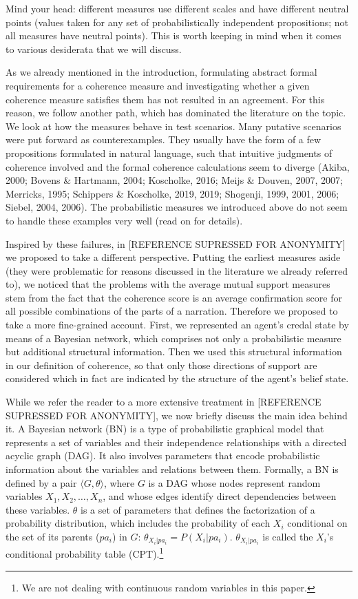 \documentclass[
  10pt,
]{scrartcl}
\begin{document}
Mind your head: different measures use different scales and have different neutral points (values taken for any set of probabilistically independent propositions; not all measures have neutral points). This is worth keeping in mind when it comes to various desiderata that we will discuss.

As we already mentioned in the introduction, formulating abstract formal requirements for a coherence measure and investigating whether a given coherence measure satisfies them has not resulted in an agreement. For this reason, we follow another path, which has dominated the literature on the topic. We look at how the measures behave in test scenarios. Many putative scenarios were put forward as counterexamples. They usually have the form of a few propositions formulated in natural language, such that intuitive judgments of coherence involved and the formal coherence calculations seem to diverge (Akiba, 2000; Bovens \& Hartmann, 2004; Koscholke, 2016; Meijs \& Douven, 2007, 2007; Merricks, 1995; Schippers \& Koscholke, 2019, 2019; Shogenji, 1999, 2001, 2006; Siebel, 2004, 2006). The probabilistic measures we introduced above do not seem to handle these examples very well (read on for details).

Inspired by these failures, in {[}REFERENCE SUPRESSED FOR ANONYMITY{]} we proposed to take a different perspective. Putting the earliest measures aside (they were problematic for reasons discussed in the literature we already referred to), we noticed that the problems with the average mutual support measures stem from the fact that the coherence score is an average confirmation score for all possible combinations of the parts of a narration. Therefore we proposed to take a more fine-grained account. First, we represented an agent's credal state by means of a Bayesian network, which comprises not only a probabilistic measure but additional structural information. Then we used this structural information in our definition of coherence, so that only those directions of support are considered which in fact are indicated by the structure of the agent's belief state.

While we refer the reader to a more extensive treatment in {[}REFERENCE SUPRESSED FOR ANONYMITY{]}, we now briefly discuss the main idea behind it. A Bayesian network (BN) is a type of probabilistic graphical model that represents a set of variables and their independence relationships with a directed acyclic graph (DAG). It also involves parameters that encode probabilistic information about the variables and relations between them. Formally, a BN is defined by a pair \(\langle G, \theta \rangle\), where \(G\) is a DAG whose nodes represent random variables \(X_1, X_2, \dots, X_n\), and whose edges identify direct dependencies between these variables. \(\theta\) is a set of parameters that defines the factorization of a probability distribution, which includes the probability of each \(X_i\) conditional on the set of its parents (\(pa_i\)) in \(G\): \(\theta_{X_i \vert pa_i}=P(X_i \vert pa_i)\). \(\theta_{X_i \vert pa_i}\) is called the \(X_i\)'s conditional probability table (CPT).\footnote{We are not dealing with continuous random variables in this paper.}
\end{document}
